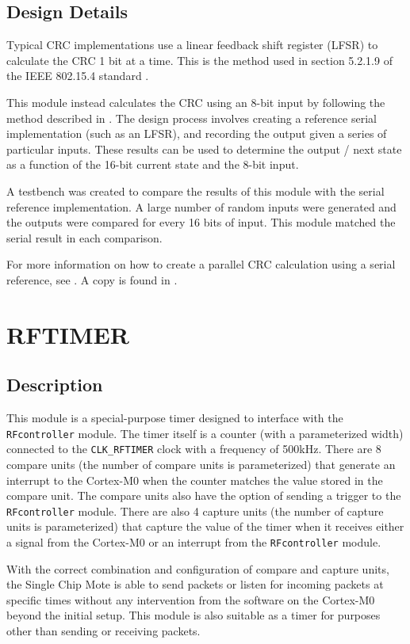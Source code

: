 \subsection{Design Details}
Typical CRC implementations use a linear feedback shift register (LFSR) to calculate the CRC 1 bit at a time. This is the method used in section 5.2.1.9 of the IEEE 802.15.4 standard \cite{15-4-standard}.

This module instead calculates the CRC using an 8-bit input by following the method described in \cite{parallel-crc}. The design process involves creating a reference serial implementation (such as an LFSR), and recording the output given a series of particular inputs. These results can be used to determine the output / next state as a function of the 16-bit current state and the 8-bit input.

A testbench was created to compare the results of this module with the serial reference implementation. A large number of random inputs were generated and the outputs were compared for every 16 bits of input. This module matched the serial result in each comparison.

For more information on how to create a parallel CRC calculation using a serial reference, see \cite{parallel-crc}. A copy is found in .

\section{RFTIMER} \label{rftimer}
\subsection{Description}
This module is a special-purpose timer designed to interface with the \texttt{RFcontroller} module. The timer itself is a counter (with a parameterized width) connected to the \texttt{CLK\_RFTIMER} clock with a frequency of 500kHz. There are 8 compare units (the number of compare units is parameterized) that generate an interrupt to the Cortex-M0 when the counter matches the value stored in the compare unit. The compare units also have the option of sending a trigger to the \texttt{RFcontroller} module. There are also 4 capture units (the number of capture units is parameterized) that capture the value of the timer when it receives either a signal from the Cortex-M0 or an interrupt from the \texttt{RFcontroller} module.

With the correct combination and configuration of compare and capture units, the Single Chip Mote is able to send packets or listen for incoming packets at specific times without any intervention from the software on the Cortex-M0 beyond the initial setup. This module is also suitable as a timer for purposes other than sending or receiving packets.

